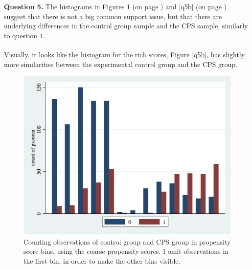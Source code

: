 \documentclass[12pt]{article}
\begin{document}
\bigskip

\textbf{Question 5.}
The histograms in Figures \ref{q5a} (on page \pageref{q5a}) and \ref{q5b} (on page \pageref{q5b}) suggest that there is not a big common support issue, but that there are underlying differences in the control group sample and the CPS sample, similarly to question 4. 
\\\\
Visually, it looks like the histogram for the rich scores, Figure \ref{q5b}, has slightly more similarities between the experimental control group and the CPS group. 
\begin{figure}
	\centering
	\includegraphics[scale = 0.2]{q4_pscorea}
	\caption{Counting observations of control group and CPS group in propensity score bins, using the coarse propensity scores. I omit observations in the first bin, in order to make the other bins visible. }
	\label{q5a}
\end{figure}
\end{document}
